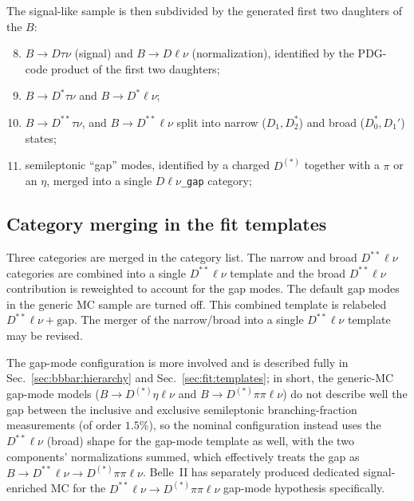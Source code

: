 The signal-like sample is then subdivided by the generated first two
daughters of the $B$:

\begin{enumerate}\setcounter{enumi}{7}
  \item $B \to D \tau \nu$ (signal) and $B \to D \ell \nu$ (normalization),
        identified by the PDG-code product of the first two daughters;
  \item $B \to D^{*} \tau \nu$ and $B \to D^{*} \ell \nu$;
  \item $B \to D^{**} \tau \nu$, and $B \to D^{**} \ell \nu$ split into
        narrow ($D_{1}, D_{2}^{*}$) and broad ($D_{0}^{*}, D_{1}'$) states;
  \item semileptonic ``gap'' modes, identified by a charged $D^{(*)}$
        together with a $\pi$ or an $\eta$, merged into a single
        \texttt{$D\ell\nu$\_gap} category;
 
\end{enumerate}









\subsection{Category merging in the fit templates}
\label{sec:truth:merging}

Three categories are merged in the
category list.
The narrow and broad $D^{**}\ell\nu$ categories are combined into a single
$D^{**}\ell\nu$ template and the broad $D^{**} \ell\nu$ contribution
is reweighted to account for the gap modes.
The default gap modes in the generic MC sample are turned off.
This combined template 
is relabeled $D^{**}\ell\nu + \text{gap}$. The merger of the narrow/broad into a single $D^{**}\ell\nu$ template may be revised. 

The gap-mode configuration is more involved and is described fully in
Sec.~\ref{sec:bbbar:hierarchy} and Sec.~\ref{sec:fit:templates}; in short, the
generic-MC gap-mode models ($B \to D^{(*)}\eta\ell\nu$ and
$B \to D^{(*)}\pi\pi\ell\nu$) do not describe well the gap between the
inclusive and exclusive semileptonic branching-fraction measurements
(of order $1.5\%$), so the nominal configuration instead uses the
$D^{**}\ell\nu$ (broad) shape for the gap-mode template as well, with the two
components' normalizations summed, which effectively treats the gap as
$B \to D^{**}\ell\nu \to D^{(*)}\pi\pi\ell\nu$.
Belle~II has separately produced dedicated signal-enriched MC for the
$D^{**}\ell\nu \to D^{(*)}\pi\pi\ell\nu$ gap-mode hypothesis specifically.


